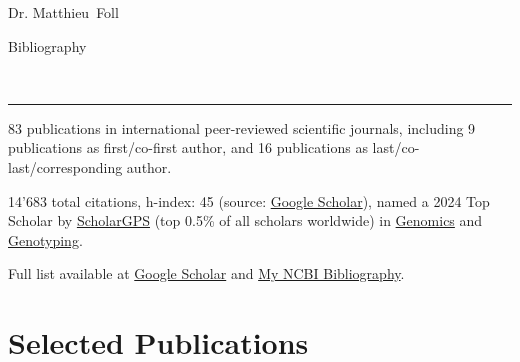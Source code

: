 \documentclass[10pt,a4paper]{article}
\newcommand{\Title}{Bibliography }
\newcommand{\FirstName}{Matthieu}
\newcommand{\LastName}{Foll}
\newcommand{\MyName}{Dr. \FirstName\ \LastName}
\begin{document}
\begin{minipage}[t]{0.5\textwidth}
  {\fontsize{20pt}{0}\selectfont\MyName}
\end{minipage}
\begin{minipage}[t]{0.5\textwidth}
  \begin{flushright}
    \Title{}
  \end{flushright}
\end{minipage}
\\[-0.1cm]
\textcolor{lightgray}{\rule{\textwidth}{3pt}}
\vspace{0.1cm}

83 publications in international peer-reviewed scientific journals, including 9 publications as first/co-first author, and 16 publications as last/co-last/corresponding author.

14'683 total citations, h-index: 45 (source: \href{https://scholar.google.com/citations?hl=en&user=vzZPQj8AAAAJ&view_op=list_works&sortby=pubdate}{Google Scholar}), named a 2024 Top Scholar by \href{https://scholargps.com/scholars/36665698545984/matthieu-foll}{ScholarGPS} (top 0.5\% of all scholars worldwide) in \href{https://scholargps.com/top-scholars?year=2024&ranking_duration=LIFETIME&specialty=Genomics&p=82&e_ref=be75210910e03c3129a7#1631}{Genomics} and \href{https://scholargps.com/top-scholars?year=2024&ranking_duration=LIFETIME&specialty=Genotyping&p=12&e_ref=be75210910e03c3129a7#236}{Genotyping}.

Full list available at \href{https://scholar.google.com/citations?hl=en&user=vzZPQj8AAAAJ&view_op=list_works&sortby=pubdate}{Google Scholar} and  \href{https://www.ncbi.nlm.nih.gov/myncbi/matthieu.foll.1/bibliography/public/}{My NCBI Bibliography}.

\section{Selected Publications}
\end{document}
